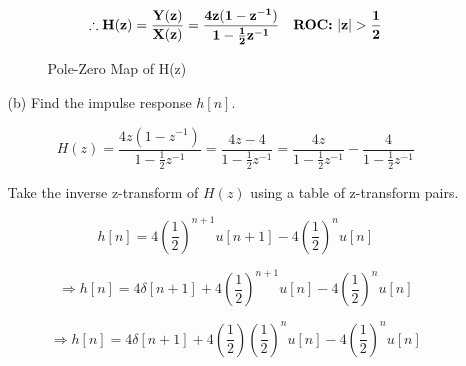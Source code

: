 \documentclass[fleqn]{article}
\begin{document}
\begin{enumerate}[nolistsep]
\begin{enumerate}[nolistsep]
						\begin{equation*}
							\mathbf{\therefore H(z) = \frac{Y(z)}{X(z)} = \frac{4z(1 - z^{-1})}{1 - \frac{1}{2}z^{-1}}\quad \text{\textbf{ROC:}}\ |z| > \frac{1}{2}}
						\end{equation*}
						
						\begin{figure}[H]				
						\centerline{}
						\caption{Pole-Zero Map of H(z)}
						\label{pzmap_prob_3_40}
						\end{figure}
						
					\item[(b)] Find the impulse response $h[n]$.
					
						\begin{equation*}
							H(z) = \frac{4z(1 - z^{-1})}{1 - \frac{1}{2}z^{-1}} = \frac{4z - 4}{1 - \frac{1}{2}z^{-1}} = \frac{4z}{1 - \frac{1}{2}z^{-1}} - \frac{4}{1 - \frac{1}{2}z^{-1}}
						\end{equation*}
						
						Take the inverse z-transform of $H(z)$ using a table of z-transform pairs.
						
						\begin{equation*}
							h[n] = 4\left(\frac{1}{2}\right)^{n+1}u[n+1] - 4\left(\frac{1}{2}\right)^{n}u[n]
						\end{equation*}
						
						\begin{equation*}
							\Rightarrow h[n] = 4\delta[n+1] + 4\left(\frac{1}{2}\right)^{n+1}u[n] - 4\left(\frac{1}{2}\right)^{n}u[n]
						\end{equation*}
						
						\begin{equation*}
							\Rightarrow h[n] = 4\delta[n+1] + 4\left(\frac{1}{2}\right)\left(\frac{1}{2}\right)^{n}u[n] - 4\left(\frac{1}{2}\right)^{n}u[n]
						\end{equation*}
						

\end{enumerate}
\end{enumerate}
\end{document}
